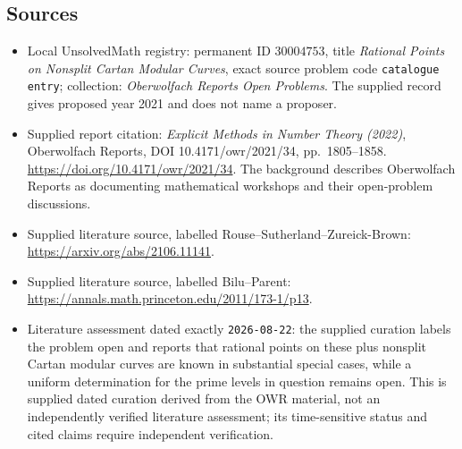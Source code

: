 \documentclass[11pt]{article}
\begin{document}
\subsection{Sources}
\begin{itemize}
\item Local UnsolvedMath registry: permanent ID \(30004753\), title \emph{Rational Points on Nonsplit Cartan Modular Curves}, exact source problem code \texttt{catalogue entry}; collection: \emph{Oberwolfach Reports Open Problems}. The supplied record gives proposed year 2021 and does not name a proposer.
\item Supplied report citation: \emph{Explicit Methods in Number Theory (2022)}, Oberwolfach Reports, DOI 10.4171/owr/2021/34, pp.\ 1805--1858. \url{https://doi.org/10.4171/owr/2021/34}. The background describes Oberwolfach Reports as documenting mathematical workshops and their open-problem discussions.
\item Supplied literature source, labelled Rouse--Sutherland--Zureick-Brown: \url{https://arxiv.org/abs/2106.11141}.
\item Supplied literature source, labelled Bilu--Parent: \url{https://annals.math.princeton.edu/2011/173-1/p13}.
\item Literature assessment dated exactly \texttt{2026-08-22}: the supplied curation labels the problem open and reports that rational points on these plus nonsplit Cartan modular curves are known in substantial special cases, while a uniform determination for the prime levels in question remains open. This is supplied dated curation derived from the OWR material, not an independently verified literature assessment; its time-sensitive status and cited claims require independent verification.
\end{itemize}
\end{document}
